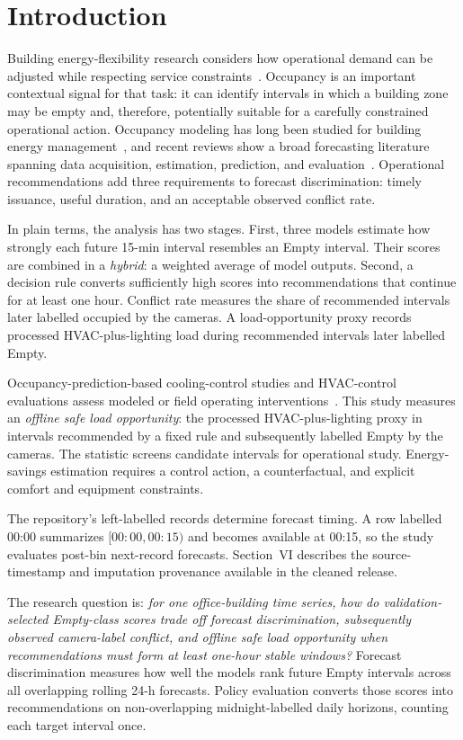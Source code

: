 \section{Introduction}

Building energy-flexibility research considers how operational demand can be adjusted while respecting service constraints~\cite{Chen2018,Junker2018}. Occupancy is an important contextual signal for that task: it can identify intervals in which a building zone may be empty and, therefore, potentially suitable for a carefully constrained operational action. Occupancy modeling has long been studied for building energy management~\cite{Erickson2014}, and recent reviews show a broad forecasting literature spanning data acquisition, estimation, prediction, and evaluation~\cite{Jin2021,CaballeroPena2024,Li2024}. Operational recommendations add three requirements to forecast discrimination: timely issuance, useful duration, and an acceptable observed conflict rate.

In plain terms, the analysis has two stages. First, three models estimate how strongly each future 15-min interval resembles an Empty interval. Their scores are combined in a \emph{hybrid}: a weighted average of model outputs. Second, a decision rule converts sufficiently high scores into recommendations that continue for at least one hour. Conflict rate measures the share of recommended intervals later labelled occupied by the cameras. A load-opportunity proxy records processed HVAC-plus-lighting load during recommended intervals later labelled Empty.

Occupancy-prediction-based cooling-control studies and HVAC-control evaluations assess modeled or field operating interventions~\cite{Peng2018,EsrafilianNajafabadi2022,Lin2023}. This study measures an \emph{offline safe load opportunity}: the processed HVAC-plus-lighting proxy in intervals recommended by a fixed rule and subsequently labelled Empty by the cameras. The statistic screens candidate intervals for operational study. Energy-savings estimation requires a control action, a counterfactual, and explicit comfort and equipment constraints.

The repository's left-labelled records determine forecast timing. A row labelled 00:00 summarizes $[00{:}00,00{:}15)$ and becomes available at 00:15, so the study evaluates post-bin next-record forecasts. Section~VI describes the source-timestamp and imputation provenance available in the cleaned release.

The research question is: \emph{for one office-building time series, how do validation-selected Empty-class scores trade off forecast discrimination, subsequently observed camera-label conflict, and offline safe load opportunity when recommendations must form at least one-hour stable windows?} Forecast discrimination measures how well the models rank future Empty intervals across all overlapping rolling 24-h forecasts. Policy evaluation converts those scores into recommendations on non-overlapping midnight-labelled daily horizons, counting each target interval once.

